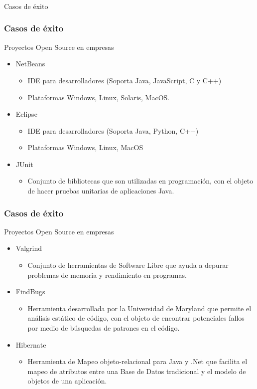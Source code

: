 \frame
{
\frametitle{}
\begin{center}
	\Huge{Casos de éxito}
\end{center}
}

\frame
{
\frametitle{Casos de éxito}
\Large{Proyectos Open Source en empresas}
\normalsize
\begin{itemize}
	\item NetBeans
	\begin{itemize}
		\item IDE para desarrolladores (Soporta Java, JavaScript, C y C++)
		\item Plataformas Windows, Linux, Solaris, MacOS.
	\end{itemize}
	\item Eclipse
	\begin{itemize}
		\item IDE para desarrolladores (Soporta Java, Python, C++)
		\item Plataformas Windows, Linux, MacOS 
	\end{itemize}
	\item JUnit
	\begin{itemize}
		\item Conjunto de bibliotecas que son utilizadas en programación,
			con el objeto de hacer pruebas unitarias de aplicaciones Java.
	\end{itemize}
\end{itemize}
}
\frame
{
\frametitle{Casos de éxito}
\Large{Proyectos Open Source en empresas}
\normalsize
\begin{itemize}
	\item Valgrind
	\begin{itemize}
		\item Conjunto de herramientas de Software Libre que ayuda a depurar
			problemas de memoria y rendimiento en programas.
	\end{itemize}
	\item FindBugs
	\begin{itemize}
		\item Herramienta desarrollada por la Universidad de Maryland
				que permite el análisis estático de código, con el objeto de encontrar
				potenciales fallos por medio de búsquedas de patrones en el código.
	\end{itemize}
	\item Hibernate
	\begin{itemize}
		\item Herramienta de Mapeo objeto-relacional para Java y .Net que facilita el mapeo
			de atributos entre una Base de Datos tradicional y el modelo de objetos de una aplicación.
	\end{itemize}
\end{itemize}
}

